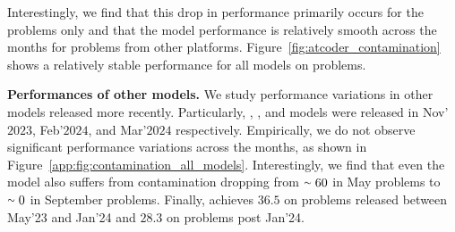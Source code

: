 Interestingly, we find that this drop in performance primarily occurs for the \leetcode{} problems only and that the model performance is relatively smooth across the months for problems from other platforms. Figure~\ref{fig:atcoder_contamination} shows a relatively stable performance for all models on \atcoder{} problems.%





\noindent \textbf{Performances of other models.}
We study performance variations in other models released more recently.
Particularly, \gptfourturbo{}, \mistrallarge{}, and \claudethrees{} models were released in Nov'$2023$, Feb'$2024$, and Mar'$2024$ respectively.
Empirically, we do not observe significant performance variations across the months, as shown in Figure~\ref{app:fig:contamination_all_models}.%
Interestingly, we find that even the  model also suffers from contamination dropping from  $\smallsim 60$ in May problems to  $\smallsim 0$ in September \leetcode{} problems. 
Finally, \codestral{} achieves  $36.5$ on problems released between May'23 and Jan'24 and  $28.3$ on problems post Jan'24.





